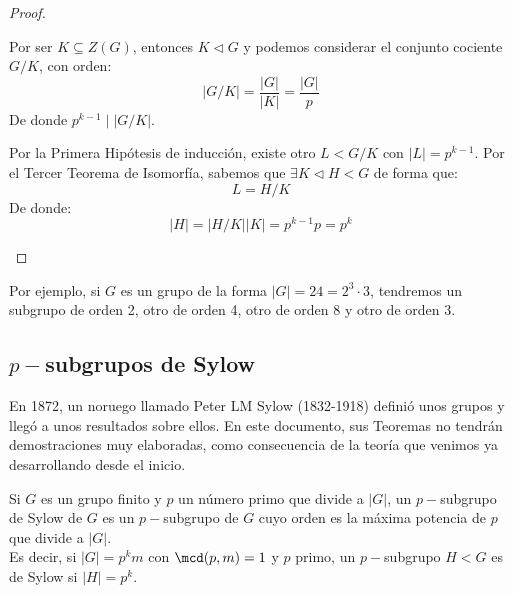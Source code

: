 \begin{teo}
\begin{proof}
\begin{itemize}
\begin{itemize}
\begin{itemize}
                                Por ser $K\subseteq Z(G)$, entonces $K\lhd G$ y podemos considerar el conjunto cociente $G/K$, con orden:
                                \begin{equation*}
                                    |G/K| = \dfrac{|G|}{|K|} = \dfrac{|G|}{p} 
                                \end{equation*}
                                De donde $p^{k-1} \mid |G/K|$.

                                Por la Primera Hipótesis de inducción, existe otro $L<G/K$ con $|L| = p^{k-1}$. Por el Tercer Teorema de Isomorfía, sabemos que $\exists K\lhd H < G$ de forma que:
                                \begin{equation*}
                                    L = H/K
                                \end{equation*}
                                De donde:
                                \begin{equation*}
                                    |H| = |H/K| |K| = p^{k-1} p = p^k
                                \end{equation*}
                        \end{itemize}
                        
                \end{itemize}
        \end{itemize}
    \end{proof}
\end{teo}

\begin{ejemplo}
    Por ejemplo, si $G$ es un grupo de la forma $|G| = 24 = 2^3 \cdot 3$, tendremos un subgrupo de orden 2, otro de orden 4, otro de orden 8 y otro de orden 3.
\end{ejemplo}

\subsection{$p-$subgrupos de Sylow}
\noindent
En 1872, un noruego llamado Peter LM Sylow (1832-1918) definió unos grupos y llegó a unos resultados sobre ellos. En este documento, sus Teoremas no tendrán demostraciones muy elaboradas, como consecuencia de la teoría que venimos ya desarrollando desde el inicio.

\begin{definicion}
    Si $G$ es un grupo finito y $p$ un número primo que divide a $|G|$, un $p-$subgrupo de Sylow de $G$ es un $p-$subgrupo de $G$ cuyo orden es la máxima potencia de $p$ que divide a $|G|$.\\

    \noindent
    Es decir, si $|G| = p^km$ con $\mcd(p,m)=1$ y $p$ primo, un $p-$subgrupo $H<G$ es de Sylow si $|H| = p^k$.
\end{definicion}

